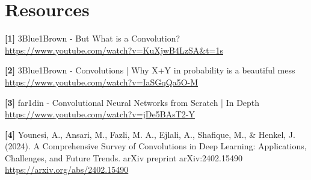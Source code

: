 \documentclass{article}
\begin{document}
\section{Resources}
    \textbf{[1]} 3Blue1Brown - But What is a Convolution? \\
    \url{https://www.youtube.com/watch?v=KuXjwB4LzSA&t=1s}
    
    \textbf{[2]} 3Blue1Brown - Convolutions | Why X+Y in probability is a beautiful mess \\
    \url{https://www.youtube.com/watch?v=IaSGqQa5O-M}
    
    \textbf{[3]} far1din - Convolutional Neural Networks from Scratch | In Depth \\
    \url{https://www.youtube.com/watch?v=jDe5BAsT2-Y}
    
    \textbf{[4]} Younesi, A., Ansari, M., Fazli, M. A., Ejlali, A., Shafique, M., \& Henkel, J. (2024). A Comprehensive Survey of Convolutions in Deep Learning: Applications, Challenges, and Future Trends. arXiv preprint arXiv:2402.15490 \\
    \url{https://arxiv.org/abs/2402.15490}
\end{document}
